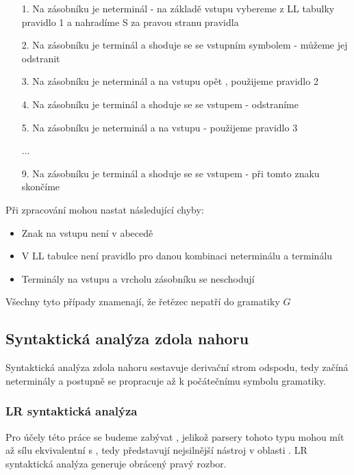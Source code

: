\begin{exmp}
\begin{itemize}
  \item[1.] Na zásobníku je neterminál  - na základě vstupu \symb{(} vybereme
  z LL tabulky pravidlo 1 a nahradíme S za pravou stranu pravidla
  \item[2.] Na zásobníku je terminál \symb{(} a shoduje se se vstupním symbolem - můžeme jej odstranit
  \item[3.] Na zásobníku je neterminál  a na vstupu opět \symb{(}, použijeme pravidlo 2
  \item[4.] Na zásobníku je terminál \symb{(} a shoduje se se vstupem - odstraníme
  \item[5.] Na zásobníku je neterminál  a na vstupu \symb{)} - použijeme pravidlo 3
  \item[] ...
  \item[9.] Na zásobníku je terminál \symb{\$} a shoduje se se vstupem - při tomto znaku skončíme
\end{itemize}
\end{exmp}

\noindent
Při zpracování mohou nastat následující chyby:

\begin{itemize}
  \item Znak na vstupu není v abecedě
  \item V LL tabulce není pravidlo pro danou kombinaci neterminálu a terminálu
  \item Terminály na vstupu a vrcholu zásobníku se neschodují
\end{itemize}

\noindent
Všechny tyto případy znamenají, že řetězec nepatří do gramatiky $G$

\subsection{Syntaktická analýza zdola nahoru}

Syntaktická analýza zdola nahoru sestavuje derivační strom odspodu,
tedy začíná neterminály a postupně se propracuje až k počátečnímu symbolu
gramatiky.


\subsubsection*{LR syntaktická analýza}
Pro účely této práce se budeme zabývat , jelikož
parsery tohoto typu mohou mít až sílu ekvivalentní s \cite[str. 155]{MedunaIFJ}, tedy představují nejsilnější nástroj
v oblasti .
LR syntaktická analýza generuje obrácený pravý rozbor.\\

